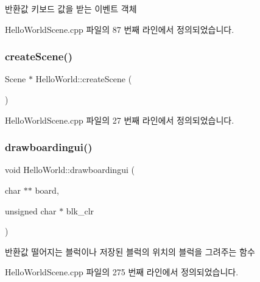 \begin{DoxyReturn}{반환값}
키보드 값을 받는 이벤트 객체 
\end{DoxyReturn}


Hello\+World\+Scene.\+cpp 파일의 87 번째 라인에서 정의되었습니다.

\mbox{\label{class_hello_world_a1b700f5f9de04271533d3fa099d7b014}} 
\subsubsection{\texorpdfstring{create\+Scene()}{createScene()}}
{\footnotesize\ttfamily Scene $\ast$ Hello\+World\+::create\+Scene (\begin{DoxyParamCaption}{ }\end{DoxyParamCaption})\hspace{0.3cm}{\ttfamily [static]}}



Hello\+World\+Scene.\+cpp 파일의 27 번째 라인에서 정의되었습니다.

\mbox{\label{class_hello_world_a0456ce3ab8880643c5e8739634156d93}} 
\subsubsection{\texorpdfstring{drawboardingui()}{drawboardingui()}}
{\footnotesize\ttfamily void Hello\+World\+::drawboardingui (\begin{DoxyParamCaption}\item[{char $\ast$$\ast$}]{board,  }\item[{unsigned char $\ast$}]{blk\+\_\+clr }\end{DoxyParamCaption})}

\begin{DoxyReturn}{반환값}
떨어지는 블럭이나 저장된 블럭의 위치의 블럭을 그려주는 함수 
\end{DoxyReturn}


Hello\+World\+Scene.\+cpp 파일의 275 번째 라인에서 정의되었습니다.

\mbox{\label{class_hello_world_ab2e9dbd1b003e6d26a10a76495efcc2a}} 
